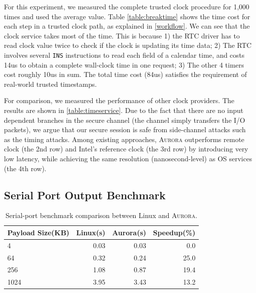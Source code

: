 For this experiment, we measured the complete trusted clock procedure for 1,000 times and used the average value. Table \ref{table:breaktime} shows the time cost for each step in a trusted clock path, as explained in \autoref{workflow}. We can see that the clock service takes most of the time. This is because 1) the RTC driver has to read clock value twice to check if the clock is updating its time data; 2) The RTC involves several \texttt{INS} instructions to read each field of a calendar time, and costs 14us to obtain a complete wall-clock time in one request; 3) The other 4 timers cost roughly 10us in sum. The total  time cost (84us) satisfies the requirement of real-world trusted timestamps.

For comparison, we measured the performance of other clock providers. The results are shown in \autoref{table:timeservice}. Due to the fact that there are no input dependent branches in the secure channel (the channel simply transfers the I/O packets), we argue that our secure session is safe from side-channel attacks such as the timing attacks. 
Among existing approaches, \textsc{Aurora} outperforms remote clock (the 2nd row) and Intel's reference clock (the 3rd row) by introducing very low latency, while achieving the same resolution (nanosecond-level) as OS services (the 4th row). 



\subsection{Serial Port Output Benchmark}

\begin{table}[t]
	\centering
	\caption{Serial-port benchmark comparison between Linux and \textsc{Aurora}.}
	\label{table:serial}
	\small
	\begin{tabular}{lrrr}
		\toprule
		\textbf{Payload Size(KB)} & \textbf{Linux(s)} & \textbf{Aurora(s)} & \textbf{Speedup(\%)} \\
		\midrule
		4 & 0.03 & 0.03 & 0.0 \\
		64 & 0.32 & 0.24 & 25.0 \\
		256 & 1.08 & 0.87 & 19.4 \\
		1024 & 3.95 & 3.43 & 13.2 \\
		\bottomrule
	\end{tabular}
\end{table}

